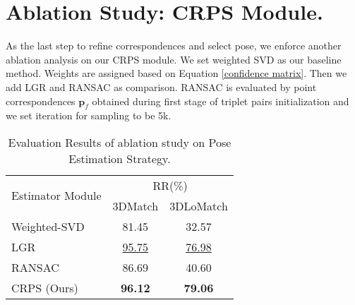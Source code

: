 \documentclass[conference,compsoc]{IEEEtran}
\begin{document}
\section{Ablation Study: CRPS Module.}
\label{crps_module}
As the last step to refine correspondences and select pose, we enforce another ablation analysis on our CRPS module. We set weighted SVD \cite{umeyama1991least} as our baseline method. Weights are assigned based on Equation \ref{confidence matrix}. Then we add LGR \cite{yu2021cofinet} and RANSAC \cite{fischler1981random} as comparison. RANSAC is evaluated by point correspondences  ${\textbf{p}_f}$ obtained during first stage of triplet pairs initialization and we set iteration for sampling to be 5k. 


\begin{table}[!ht]
\tiny
\begin{center}
\caption{\label{tab:ablation_estimator_exp}Evaluation Results of ablation study on Pose Estimation Strategy.}
\begin{tabular}{ p{3.0cm}|p{0.7cm}|p{0.7cm} }
\hline
\multirow{2}{*}{Estimator Module} 
& \multicolumn{2}{c}{RR(\%)} \\
& \multicolumn{1}{c}{3DMatch} & \multicolumn{1}{c}{3DLoMatch}  \\\cline{2-3}\hline\hline
Weighted-SVD \cite{umeyama1991least} & \multicolumn{1}{c}{81.45} & \multicolumn{1}{c}{32.57} \\ 
LGR \cite{yu2021cofinet} & \multicolumn{1}{c}{\underline{95.75}} & \multicolumn{1}{c}{\underline{76.98}} \\ 
RANSAC \cite{fischler1981random} & \multicolumn{1}{c}{86.69} & \multicolumn{1}{c}{40.60} \\ \hline\hline
CRPS (Ours) & \multicolumn{1}{c}{\textbf{96.12}} & \multicolumn{1}{c}{\textbf{79.06}} \\ \hline
\end{tabular}
\end{center}
\end{table}
\end{document}
